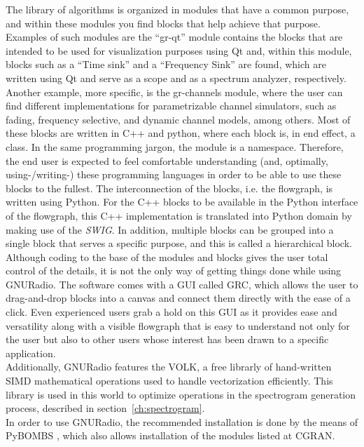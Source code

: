 The library of algorithms is organized in modules that have a common purpose, and within these modules you find blocks that help achieve that purpose. Examples of such modules are the “gr-qt” module contains the blocks that are intended to be used for visualization purposes using Qt \cite{Qt} and, within this module, blocks such as a “Time sink” and a “Frequency Sink” are found, which are written using Qt and serve as a scope and as a spectrum analyzer, respectively. Another example, more specific, is the gr-channels module, where the user can find different implementations for parametrizable channel simulators, such as fading, frequency selective, and dynamic channel models, among others. Most of these blocks are written in C++ and python, where each block is, in end effect, a class. In the same programming jargon, the module is a namespace. Therefore, the end user is expected to feel comfortable understanding (and, optimally, using-/writing-) these programming languages in order to be able to use these blocks to the fullest. The interconnection of the blocks, i.e. the flowgraph, is written using Python. For the C++ blocks to be available in the Python interface of the flowgraph, this C++ implementation is translated into Python domain by making use of the \emph{\ac{SWIG}}. In addition, multiple blocks can be grouped into a single block that serves a specific purpose, and this is called a hierarchical block.\\

Although coding to the base of the modules and blocks gives the user total control of the details, it is not the only way of getting things done while using GNURadio. The software comes with a \ac{GUI} called \ac{GRC}, which allows the user to drag-and-drop blocks into a canvas and connect them directly with the ease of a click. Even experienced users grab a hold on this \ac{GUI} as it provides ease and versatility along with a visible flowgraph that is easy to understand not only for the user but also to other users whose interest has been drawn to a specific application.\\

Additionally, GNURadio features the \ac{VOLK}\cite{VOLK}, a free librarly of hand-written SIMD mathematical operations used to handle vectorization efficiently. This library is used in this world to optimize operations in the spectrogram generation process, described in section~\ref{ch:spectrogram}.\\

In order to use GNURadio, the recommended installation is done by the means of \ac{PyBOMBS} \cite{PyBOMBS}, which also allows installation of the modules listed at \ac{CGRAN}.

